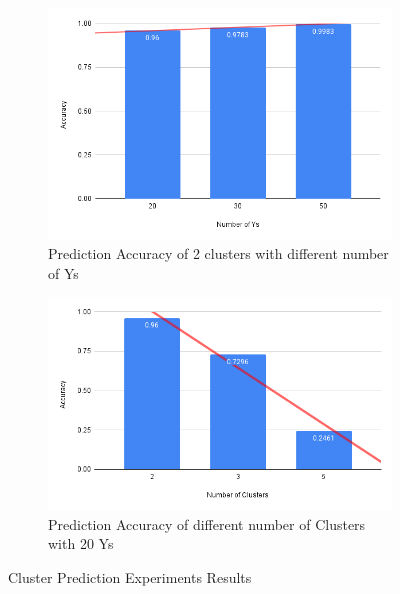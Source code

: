 \documentclass{article}
\begin{document}
\begin{figure}[htbp!]
  \centering
  \begin{subfigure}{0.49\textwidth}
      \centering
      \includegraphics[width=\textwidth]{images/experiments/dif_ys.png}
      \caption{Prediction Accuracy of 2 clusters with different number of Ys}
  \end{subfigure}
  \hfill
  \begin{subfigure}{0.49\textwidth}
      \centering
      \includegraphics[width=\textwidth]{images/experiments/exp_diff_clusters.png} %
      \caption{Prediction Accuracy of different number of Clusters with 20 Ys}
  \end{subfigure}
  \caption{Cluster Prediction Experiments Results}
  \label{fig:exp_res}
\end{figure}
\end{document}
